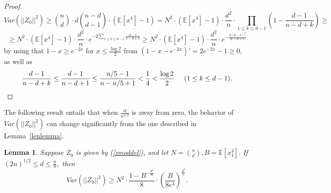 \documentclass{article}
\newtheorem{lemma}{Lemma}
\numberwithin{equation}{section}
\begin{document}
\begin{proof}
    \[ Var(||Z_0||^2) \geq \binom{n}{d} \cdot d\binom{n-d}{d-1} \cdot (\mathbb{E}[x^4]-1)=N^2 \cdot (\mathbb{E}[x^4]-1) \cdot \frac{d^2}{n} \cdot \prod_{1 \leq k \leq d-1}{(1-\frac{d-1}{n-d+k})} \geq\]
    \begin{equation}\label{lbvar}
        \geq N^2 \cdot (\mathbb{E}[x^4]-1) \cdot \frac{d^2}{n} \cdot e^{-2\sum_{1 \leq k \leq d-1}{\frac{d-1}{n-d+k}}} \geq N^2 \cdot (\mathbb{E}[x^4]-1) \cdot \frac{d^2}{n} \cdot e^{-\frac{2(d-1)^2}{n-d+1}}
    \end{equation}
    by using that \(1-x \geq e^{-2x}\) for \(x \leq \frac{\log{2}}{2}\) from \((1-x-e^{-2x})'=2e^{-2x}-1 \geq 0,\) as well as 
    \[\frac{d-1}{n-d+k} \leq \frac{d-1}{n-d+1} \leq \frac{n/5-1}{n-n/5+1}<\frac{1}{4}<\frac{\log{2}}{2} \hspace{0.5cm} (1 \leq k \leq d-1).\] 
\end{proof}

The following result entails that when \(\frac{d}{n^{1/2}}\) is away from zero, the behavior of \(Var(||Z_0||^2)\) can change significantly from the one described in Lemma~\ref{lenlemma}.

\begin{lemma}\label{lenlemma2}
   Suppose \(Z_0\) is given by (\ref{zmoddel}), and let \(N=\binom{n}{d},B=\mathbb{E}[x_1^4].\) If \((2n)^{1/2} \leq d \leq \frac{n}{8},\) then 
    \[Var(||Z_0||^2) \geq N^2 \cdot \frac{1-B^{-\frac{d^2}{n}}}{8} \cdot (\frac{B}{8e^4})^{\frac{d^2}{n}}.\]
\end{lemma}
\end{document}
